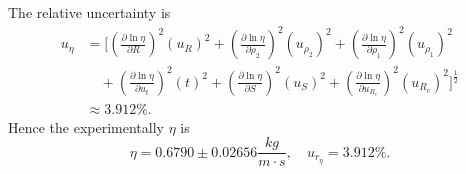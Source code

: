     The relative uncertainty is
    \[
    \begin{split}
        u_{\eta}&=[(\frac{\partial\ln\eta}{\partial R})^2(u_R)^2+(\frac{\partial\ln\eta}{\partial \rho_2})^2(u_{\rho_2})^2+(\frac{\partial\ln\eta}{\partial \rho_1})^2(u_{\rho_1})^2\\
        &\quad+(\frac{\partial\ln\eta}{\partial u_t})^2(t)^2+(\frac{\partial\ln\eta}{\partial S})^2(u_S)^2+(\frac{\partial\ln\eta}{\partial u_{R_c}})^2(u_{R_c})^2]^\frac{1}{2}\\
        &\approx 3.912\%.
    \end{split}
    \]
    Hence the experimentally $\eta$ is
    \[
        \eta=0.6790\pm 0.02656\frac{kg}{m\cdot s}, \quad u_{r_{\eta}}=3.912\%.
    \]
